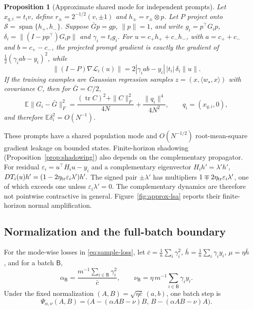 \documentclass[11pt]{article}
\newtheorem{proposition}[theorem]{Proposition}
\newcommand{\E}{\mathbb E}
\begin{document}
\begin{proposition}[Approximate shared mode for independent prompts]
\label{prop:approx-shared-mode}
Let \(x_{q,i}=t_i v\), define $r_\pm=2^{-1/2}(v,\pm1)$ and $h_\pm=r_\pm\otimes p$. Let \(P\) project onto
\(\mathcal S=\operatorname{span}\{h_+,h_-\}\).  Suppose
\(\bar Gp=g p\), \(\|p\|=1\), and write $g_i=p^\top G_i p$, $\delta_i=\|(I-pp^\top)G_i p\|$ and $\gamma_i=t_i g_i$. For \(u=c_+h_++c_-h_-\), with \(a=c_++c_-\) and \(b=c_+-c_-\),
the projected prompt gradient is exactly the gradient of
\(\frac12(\gamma_iab-y_i)^2\), while
\begin{equation}
\label{eq:gradient-leakage}
\|(I-P)\nabla\mathcal L_i(u)\|
=2|\gamma_iab-y_i|\,|t_i|\,\delta_i\|u\|.
\end{equation}
If the training examples are Gaussian regression samples
\(z=(x,\langle w_\star,x\rangle)\) with covariance \(C\), then for
\(\bar G=C/2\),
\begin{equation}
\label{eq:gram-concentration}
\E\|G_i-\bar G\|_F^2
=\frac{(\operatorname{tr}C)^2+\|C\|_F^2}{4N}
+ \frac{\|q_i\|^4}{4N^2},
\qquad q_i=(x_{q,i},0),
\end{equation}
and therefore \(\E\delta_i^2=O(N^{-1})\).
\end{proposition}

These prompts have a shared population mode and \(O(N^{-1/2})\)
root-mean-square gradient leakage on bounded states.  Finite-horizon
shadowing (Proposition~\ref{prop:shadowing}) also depends on the
complementary propagator.  For residual
\(\varepsilon_i=u^\top H_i u-y_i\) and a complementary eigenvector
\(H_i h'=\lambda'h'\), $DT_i(u)h'=(1-2\eta_{\rm tr}\varepsilon_i\lambda')h'.$ The signed pair \(\pm\lambda'\) has multipliers
\(1\mp2\eta_{\rm tr}\varepsilon_i\lambda'\), one of which exceeds one unless
\(\varepsilon_i\lambda'=0\).  The complementary dynamics are therefore not
pointwise contractive in general.  Figure~\ref{fig:approx-lsa} reports their
finite-horizon normal amplification.

\subsection{Normalization and the full-batch boundary}

For the mode-wise losses in \eqref{eq:sample-loss}, let $\bar c=\frac1n\sum_i\gamma_i^2$, $\bar h=\frac1n\sum_i\gamma_i y_i$, $\mu=\eta\bar h$, and for a batch \(\mathsf B\),
\[
    \alpha_{\mathsf B}
    =
    \frac{m^{-1}\sum_{i\in\mathsf B}\gamma_i^2}{\bar c},
    \qquad
    \nu_{\mathsf B}
    =
    \eta\,m^{-1}\sum_{i\in\mathsf B}\gamma_i y_i.
\]
Under the fixed normalization
\((A,B)=\sqrt{\eta\bar c}\,(a,b)\), one batch step is
\begin{equation}
\label{eq:Psi}
    \Psi_{\alpha,\nu}(A,B)
    =
    \bigl(A-(\alpha AB-\nu)B,\,
          B-(\alpha AB-\nu)A\bigr).
\end{equation}
\end{document}
